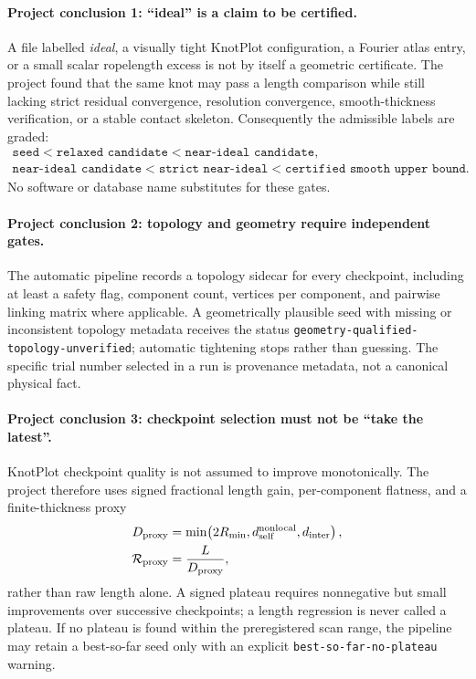 \documentclass[11pt]{article}
\theoremstyle{definition}
\theoremstyle{plain}
\theoremstyle{remark}
\begin{document}
\paragraph{Project conclusion 1: ``ideal'' is a claim to be certified.}
A file labelled \emph{ideal}, a visually tight KnotPlot configuration, a
Fourier atlas entry, or a small scalar ropelength excess is not by itself a
geometric certificate.  The project found that the same knot may pass a length
comparison while still lacking strict residual convergence, resolution
convergence, smooth-thickness verification, or a stable contact skeleton.
Consequently the admissible labels are graded:
\begin{equation}
    \begin{gathered}
        \texttt{seed}<\texttt{relaxed candidate}<\texttt{near-ideal candidate},\\
        \texttt{near-ideal candidate}<\texttt{strict near-ideal}
        <\texttt{certified smooth upper bound}.
    \end{gathered}
    \label{eq:genesis_knotplot_status_ladder}
\end{equation}
No software or database name substitutes for these gates.

\paragraph{Project conclusion 2: topology and geometry require independent gates.}
The automatic pipeline records a topology sidecar for every checkpoint,
including at least a safety flag, component count, vertices per component, and
pairwise linking matrix where applicable.  A geometrically plausible seed with
missing or inconsistent topology metadata receives the status
\texttt{geometry-qualified-topology-unverified}; automatic tightening stops
rather than guessing.  The specific trial number selected in a run is
provenance metadata, not a canonical physical fact.

\paragraph{Project conclusion 3: checkpoint selection must not be ``take the latest''.}
KnotPlot checkpoint quality is not assumed to improve monotonically.  The
project therefore uses signed fractional length gain, per-component flatness,
and a finite-thickness proxy
\begin{align}
    D_{\rm proxy}
    &=
    \min\!\left(2R_{\min},d_{\rm self}^{\rm nonlocal},d_{\rm inter}\right),
    \\
    \mathcal R_{\rm proxy}
    &=
    \frac{L}{D_{\rm proxy}},
    \label{eq:genesis_knotplot_seed_proxy}
\end{align}
rather than raw length alone.  A signed plateau requires nonnegative but small
improvements over successive checkpoints; a length regression is never called
a plateau.  If no plateau is found within the preregistered scan range, the
pipeline may retain a best-so-far seed only with an explicit
\texttt{best-so-far-no-plateau} warning.
\end{document}
